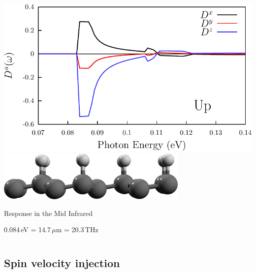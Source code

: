 \documentclass{beamer}
\begin{document}
\begin{frame}
\begin{columns}
\begin{center}
\vspace{-1mm}
\includegraphics[width=1.0\textwidth]{figs/plots/dsp-up.pdf}
\vspace{6mm}
\includegraphics[width=0.7\textwidth]{figs/up2.png}

\vspace{7mm}
Response in the Mid Infrared

0.084\,eV = 14.7\,$\mu$m = 20.3\,THz

\end{center}


\end{columns}

\end{frame}


\subsection{Spin velocity injection}
\end{document}
